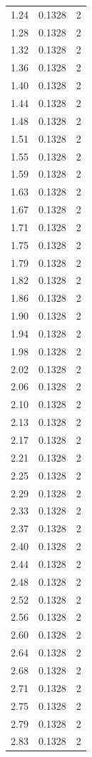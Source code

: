 \begin{longtable}{lrr}
  1.24 & 0.1328 & 2 \\
  1.28 & 0.1328 & 2 \\
  1.32 & 0.1328 & 2 \\
  1.36 & 0.1328 & 2 \\
  1.40 & 0.1328 & 2 \\
  1.44 & 0.1328 & 2 \\
  1.48 & 0.1328 & 2 \\
  1.51 & 0.1328 & 2 \\
  1.55 & 0.1328 & 2 \\
  1.59 & 0.1328 & 2 \\
  1.63 & 0.1328 & 2 \\
  1.67 & 0.1328 & 2 \\
  1.71 & 0.1328 & 2 \\
  1.75 & 0.1328 & 2 \\
  1.79 & 0.1328 & 2 \\
  1.82 & 0.1328 & 2 \\
  1.86 & 0.1328 & 2 \\
  1.90 & 0.1328 & 2 \\
  1.94 & 0.1328 & 2 \\
  1.98 & 0.1328 & 2 \\
  2.02 & 0.1328 & 2 \\
  2.06 & 0.1328 & 2 \\
  2.10 & 0.1328 & 2 \\
  2.13 & 0.1328 & 2 \\
  2.17 & 0.1328 & 2 \\
  2.21 & 0.1328 & 2 \\
  2.25 & 0.1328 & 2 \\
  2.29 & 0.1328 & 2 \\
  2.33 & 0.1328 & 2 \\
  2.37 & 0.1328 & 2 \\
  2.40 & 0.1328 & 2 \\
  2.44 & 0.1328 & 2 \\
  2.48 & 0.1328 & 2 \\
  2.52 & 0.1328 & 2 \\
  2.56 & 0.1328 & 2 \\
  2.60 & 0.1328 & 2 \\
  2.64 & 0.1328 & 2 \\
  2.68 & 0.1328 & 2 \\
  2.71 & 0.1328 & 2 \\
  2.75 & 0.1328 & 2 \\
  2.79 & 0.1328 & 2 \\
  2.83 & 0.1328 & 2 \\

\end{longtable}
